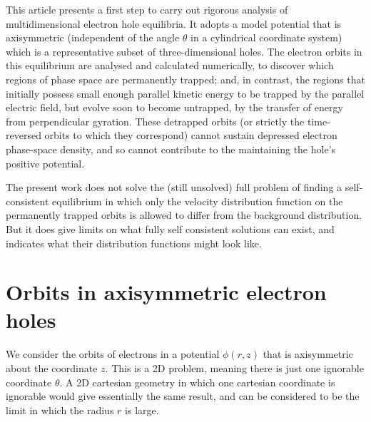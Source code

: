 \documentclass{agujournal2019}
\begin{document}
This article presents a first step to carry out rigorous analysis of
multidimensional electron hole equilibria. It adopts a model potential
that is axisymmetric (independent of the angle $\theta$ in a
cylindrical coordinate system) which is a representative subset of
three-dimensional holes. The electron orbits in this equilibrium are
analysed and calculated numerically, to discover which regions of
phase space are permanently trapped; and, in contrast, the regions
that initially possess small enough parallel kinetic energy to be
trapped by the parallel electric field, but evolve soon to become
untrapped, by the transfer of energy from perpendicular
gyration. These detrapped orbits (or strictly the time-reversed orbits
to which they correspond) cannot sustain depressed electron
phase-space density, and so cannot contribute to the maintaining the
hole's positive potential.

The present work does not solve the (still unsolved) full problem of
finding a self-consistent equilibrium in which only the velocity
distribution function on the permanently trapped orbits is allowed to
differ from the background distribution. But it does give limits on
what fully self consistent solutions can exist, and indicates what
their distribution functions might look like.


\section{Orbits in axisymmetric electron holes}

We consider the orbits of electrons in a potential $\phi(r,z)$ that is
axisymmetric about the coordinate $z$. This is a 2D problem, meaning
there is just one ignorable coordinate $\theta$. A 2D cartesian
geometry in which one cartesian coordinate is ignorable would give
essentially the same result, and can be considered to be the limit in
which the radius $r$ is large.
\end{document}
